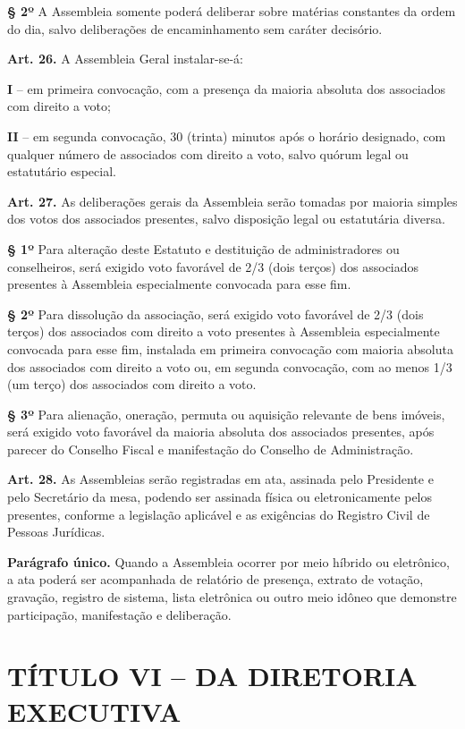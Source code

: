 \documentclass[11pt,a4paper]{article}
\begin{document}
\textbf{§ 2º} A Assembleia somente poderá deliberar sobre matérias constantes da ordem do dia, salvo deliberações de encaminhamento sem caráter decisório.

\textbf{Art. 26.} A Assembleia Geral instalar-se-á:

\textbf{I} -- em primeira convocação, com a presença da maioria absoluta dos associados com direito a voto;

\textbf{II} -- em segunda convocação, 30 (trinta) minutos após o horário designado, com qualquer número de associados com direito a voto, salvo quórum legal ou estatutário especial.

\textbf{Art. 27.} As deliberações gerais da Assembleia serão tomadas por maioria simples dos votos dos associados presentes, salvo disposição legal ou estatutária diversa.

\textbf{§ 1º} Para alteração deste Estatuto e destituição de administradores ou conselheiros, será exigido voto favorável de 2/3 (dois terços) dos associados presentes à Assembleia especialmente convocada para esse fim.

\textbf{§ 2º} Para dissolução da associação, será exigido voto favorável de 2/3 (dois terços) dos associados com direito a voto presentes à Assembleia especialmente convocada para esse fim, instalada em primeira convocação com maioria absoluta dos associados com direito a voto ou, em segunda convocação, com ao menos 1/3 (um terço) dos associados com direito a voto.

\textbf{§ 3º} Para alienação, oneração, permuta ou aquisição relevante de bens imóveis, será exigido voto favorável da maioria absoluta dos associados presentes, após parecer do Conselho Fiscal e manifestação do Conselho de Administração.

\textbf{Art. 28.} As Assembleias serão registradas em ata, assinada pelo Presidente e pelo Secretário da mesa, podendo ser assinada física ou eletronicamente pelos presentes, conforme a legislação aplicável e as exigências do Registro Civil de Pessoas Jurídicas.

\textbf{Parágrafo único.} Quando a Assembleia ocorrer por meio híbrido ou eletrônico, a ata poderá ser acompanhada de relatório de presença, extrato de votação, gravação, registro de sistema, lista eletrônica ou outro meio idôneo que demonstre participação, manifestação e deliberação.

\section*{TÍTULO VI -- DA DIRETORIA EXECUTIVA}
\end{document}
